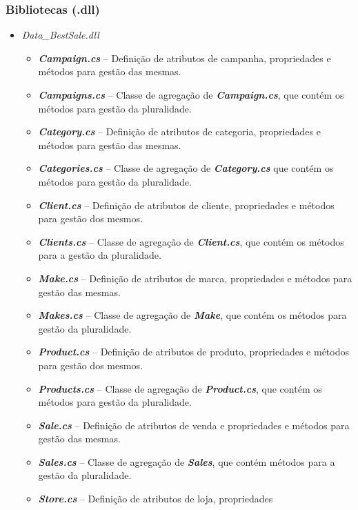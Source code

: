 \documentclass[11pt]{scrartcl} %
\begin{document}
\subsubsection{Bibliotecas (.dll)}
\begin{itemize}
	\item \textit{Data\_BestSale.dll}
		\begin{itemize}
			\item
			\emph{\textbf{Campaign.cs}} -- Definição de atributos de campanha,
			propriedades e métodos para gestão das mesmas.
			\item
			\emph{\textbf{Campaigns.cs}} -- Classe de agregação de
			\emph{\textbf{Campaign.cs}}, que contém os métodos para gestão da
			pluralidade.
			\item
			\emph{\textbf{Category.cs}} -- Definição de atributos de categoria,
			propriedades e métodos para gestão das mesmas.
			\item
			\emph{\textbf{Categories.cs}} -- Classe de agregação de
			\emph{\textbf{Category.cs}} que contém os métodos para gestão da
			pluralidade.
			\item
			\emph{\textbf{Client.cs}} -- Definição de atributos de cliente,
			propriedades e métodos para gestão dos mesmos.
			\item
			\emph{\textbf{Clients.cs}} -- Classe de agregação de
			\emph{\textbf{Client.cs}}, que contém os métodos para a gestão da
			pluralidade.
			\item
			\emph{\textbf{Make.cs}} -- Definição de atributos de marca, propriedades
			e métodos para gestão das mesmas.
			\item
			\emph{\textbf{Makes.cs}} -- Classe de agregação de \emph{\textbf{Make}},
			que contém os métodos para gestão da pluralidade.
			\item
			\emph{\textbf{Product.cs}} -- Definição de atributos de produto,
			propriedades e métodos para gestão dos mesmos.
			\item
			\emph{\textbf{Products.cs}} -- Classe de agregação de
			\emph{\textbf{Product.cs}}, que contém os métodos para gestão da
			pluralidade.
			\item
			\emph{\textbf{Sale.cs}} -- Definição de atributos de venda e propriedades
			e métodos para gestão das mesmas.
			\item
			\emph{\textbf{Sales.cs}} -- Classe de agregação de \emph{\textbf{Sales}},
			que contém métodos para a gestão da pluralidade.
			\item
			\emph{\textbf{Store.cs}} -- Definição de atributos de loja, propriedades

\end{itemize}
\end{itemize}
\end{document}
